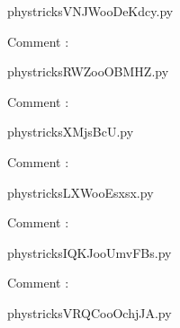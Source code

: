     \newcommand{\CaptionFigVNJWooDeKdcy}{<+Type your caption here+>}
    \begin{center}
        
    \end{center}
    phystricksVNJWooDeKdcy.py

    Comment : 

    \clearpage
    


    \newcommand{\CaptionFigRWZooOBMHZ}{<+Type your caption here+>}
    \begin{center}
        
    \end{center}
    phystricksRWZooOBMHZ.py

    Comment : 

    \clearpage
    


    \newcommand{\CaptionFigXMjsBcU}{<+Type your caption here+>}
    \begin{center}
        
    \end{center}
    phystricksXMjsBcU.py

    Comment : 

    \clearpage
    


    \newcommand{\CaptionFigLXWooEsxsx}{<+Type your caption here+>}
    \begin{center}
        
    \end{center}
    phystricksLXWooEsxsx.py

    Comment : 

    \clearpage
    


    \newcommand{\CaptionFigIQKJooUmvFBs}{<+Type your caption here+>}
    \begin{center}
        
    \end{center}
    phystricksIQKJooUmvFBs.py

    Comment : 

    \clearpage
    


    \newcommand{\CaptionFigVRQCooOchjJA}{<+Type your caption here+>}
    \begin{center}
        
    \end{center}
    phystricksVRQCooOchjJA.py

